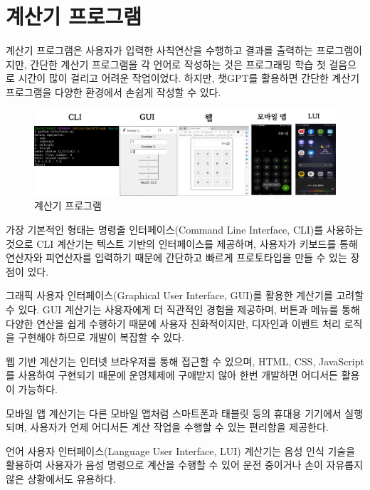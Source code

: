 \documentclass[
  letterpaper,
]{book}
\begin{document}
\hypertarget{uxacc4uxc0b0uxae30-uxd504uxb85cuxadf8uxb7a8}{%
\section{계산기
프로그램}\label{uxacc4uxc0b0uxae30-uxd504uxb85cuxadf8uxb7a8}}

계산기 프로그램은 사용자가 입력한 사칙연산을 수행하고 결과를 출력하는
프로그램이지만, 간단한 계산기 프로그램을 각 언어로 작성하는 것은
프로그래밍 학습 첫 걸음으로 시간이 많이 걸리고 어려운 작업이었다.
하지만, 챗GPT를 활용하면 간단한 계산기 프로그램을 다양한 환경에서 손쉽게
작성할 수 있다.

\begin{figure}

{\centering \includegraphics{images/calculator.jpg}

}

\caption{계산기 프로그램}

\end{figure}

가장 기본적인 형태는 명령줄 인터페이스(Command Line Interface, CLI)를
사용하는 것으로 CLI 계산기는 텍스트 기반의 인터페이스를 제공하며,
사용자가 키보드를 통해 연산자와 피연산자를 입력하기 때문에 간단하고
빠르게 프로토타입을 만들 수 있는 장점이 있다.

그래픽 사용자 인터페이스(Graphical User Interface, GUI)를 활용한
계산기를 고려할 수 있다. GUI 계산기는 사용자에게 더 직관적인 경험을
제공하며, 버튼과 메뉴를 통해 다양한 연산을 쉽게 수행하기 때문에 사용자
친화적이지만, 디자인과 이벤트 처리 로직을 구현해야 하므로 개발이 복잡할
수 있다.

웹 기반 계산기는 인터넷 브라우저를 통해 접근할 수 있으며, HTML, CSS,
JavaScript를 사용하여 구현되기 때문에 운영체제에 구애받지 않아 한번
개발하면 어디서든 활용이 가능하다.

모바일 앱 계산기는 다른 모바일 앱처럼 스마트폰과 태블릿 등의 휴대용
기기에서 실행되며, 사용자가 언제 어디서든 계산 작업을 수행할 수 있는
편리함을 제공한다.

언어 사용자 인터페이스(Language User Interface, LUI) 계산기는 음성 인식
기술을 활용하여 사용자가 음성 명령으로 계산을 수행할 수 있어 운전
중이거나 손이 자유롭지 않은 상황에서도 유용하다.
\end{document}
